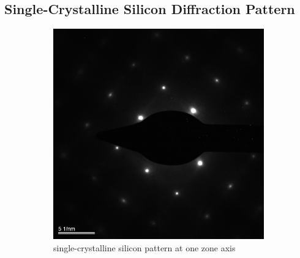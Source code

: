 \documentclass[12pt,a4paper]{article}
\begin{document}

\subsection{Single-Crystalline Silicon Diffraction Pattern} %
\label{sub:single_crystaline}

\lipsum[20]

\begin{figure}[htbp]
  \centering
    \begin{subfigure}[b]{0.45\textwidth}
    \includegraphics[width=\textwidth]{data/Image3 Si_Diff_Zone1.png}
    \caption{single-crystalline silicon pattern at one zone axis}
    \label{fig:si1}
  \end{subfigure}%
  ~
  \begin{subfigure}[b]{0.45\textwidth}

\end{subfigure}
\end{figure}
\end{document}
